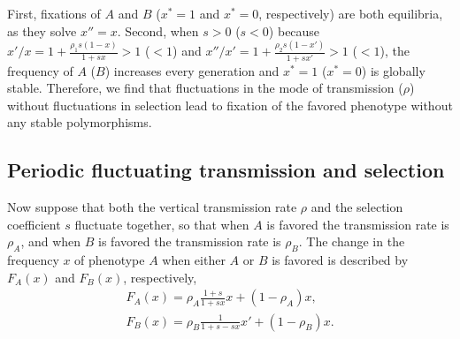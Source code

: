 \documentclass[11pt]{extarticle}
\begin{document}
First, fixations of $A$ and $B$ ($x^*=1$ and $x^*=0$, respectively) are both equilibria, as they solve $x''=x$.
Second, when $s>0$ ($s<0$) because $x'/x = 1+\frac{\rho_1 s (1-x)}{1+sx} > 1$ ($<1$) and $x''/x' = 1+\frac{\rho_2 s (1-x')}{1+sx'} > 1$ ($<1$), the frequency of $A$ ($B$) increases every generation and $x^*=1$ ($x^*=0$) is globally stable.
Therefore, we find that fluctuations in the mode of transmission ($\rho$) without fluctuations in selection lead to fixation of the favored phenotype without any stable polymorphisms.

\subsection*{Periodic fluctuating transmission and selection}

Now suppose that both the vertical transmission rate $\rho$ and the selection coefficient $s$ fluctuate together, so that when $A$ is favored the transmission rate is $\rho_A$, and when $B$ is favored the transmission rate is $\rho_B$.
The change in the frequency $x$ of phenotype $A$ when either $A$ or $B$ is favored is described by $F_A(x)$ and $F_B(x)$, respectively,
\begin{equation}\begin{aligned} \label{eq:recurrence_periodic_fluc}
F_A(x) = \rho_A \frac{1+s}{1+sx} x + (1-\rho_A)x, \\
F_B(x) = \rho_B \frac{1}{1+s-sx} x' + (1-\rho_B)x.
\end{aligned}\end{equation}
\end{document}
